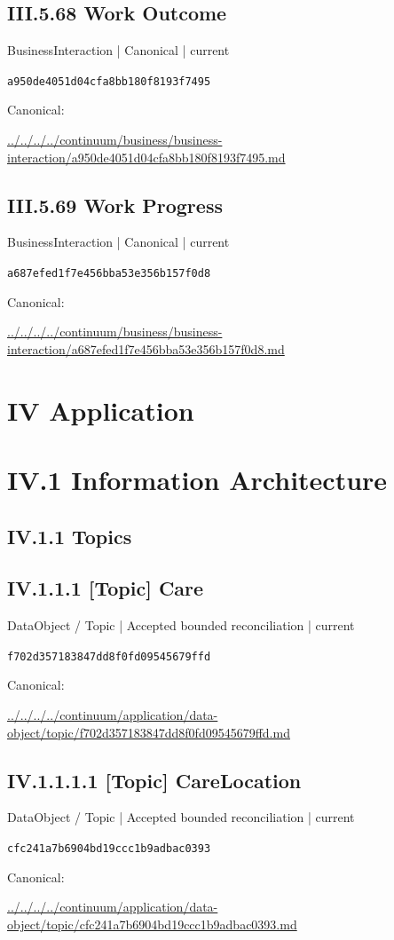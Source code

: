 \documentclass[10pt,a4paper]{article}
\begin{document}
\subsection*{III.5.68 Work Outcome}
{\small BusinessInteraction | Canonical | current}\par
\texttt{a950de4051d04cfa8bb180f8193f7495}\par
Canonical: \par
{\footnotesize\url{../../../../continuum/business/business-interaction/a950de4051d04cfa8bb180f8193f7495.md}}\par
\subsection*{III.5.69 Work Progress}
{\small BusinessInteraction | Canonical | current}\par
\texttt{a687efed1f7e456bba53e356b157f0d8}\par
Canonical: \par
{\footnotesize\url{../../../../continuum/business/business-interaction/a687efed1f7e456bba53e356b157f0d8.md}}\par
\section*{IV Application}
\section*{IV.1 Information Architecture}
\subsection*{IV.1.1 Topics}
\subsection*{IV.1.1.1 [Topic] Care}
{\small DataObject / Topic | Accepted bounded reconciliation | current}\par
\texttt{f702d357183847dd8f0fd09545679ffd}\par
Canonical: \par
{\footnotesize\url{../../../../continuum/application/data-object/topic/f702d357183847dd8f0fd09545679ffd.md}}\par
\subsection*{IV.1.1.1.1 [Topic] CareLocation}
{\small DataObject / Topic | Accepted bounded reconciliation | current}\par
\texttt{cfc241a7b6904bd19ccc1b9adbac0393}\par
Canonical: \par
{\footnotesize\url{../../../../continuum/application/data-object/topic/cfc241a7b6904bd19ccc1b9adbac0393.md}}\par
\end{document}
